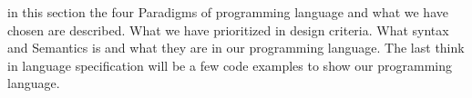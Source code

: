 in this section the four Paradigms of programming language and what we have chosen are described. What we have prioritized in design criteria. What syntax and Semantics is and what they are in our programming language. The last think in language specification will be a few code examples to show our programming language.